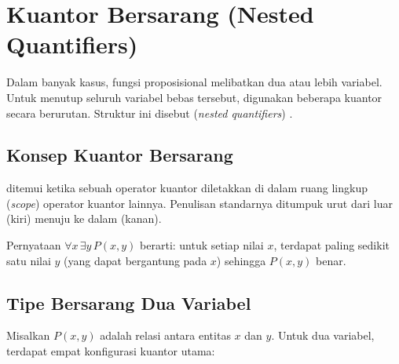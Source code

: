\section{Kuantor Bersarang (Nested Quantifiers)}

Dalam banyak kasus, fungsi proposisional melibatkan dua atau lebih variabel. Untuk menutup seluruh variabel bebas tersebut, digunakan beberapa kuantor secara berurutan. Struktur ini disebut  (\textit{nested quantifiers}) \cite{rosen2019}.

\subsection{Konsep Kuantor Bersarang}

\begin{definisi}
 ditemui ketika sebuah operator kuantor diletakkan di dalam ruang lingkup (\textit{scope}) operator kuantor lainnya. Penulisan standarnya ditumpuk urut dari luar (kiri) menuju ke dalam (kanan).
\end{definisi}

Pernyataan $\forall x \, \exists y \, P(x, y)$ berarti: untuk setiap nilai $x$, terdapat paling sedikit satu nilai $y$ (yang dapat bergantung pada $x$) sehingga $P(x,y)$ benar.

\subsection{Tipe Bersarang Dua Variabel}

Misalkan $P(x, y)$ adalah relasi antara entitas $x$ dan $y$. Untuk dua variabel, terdapat empat konfigurasi kuantor utama:

